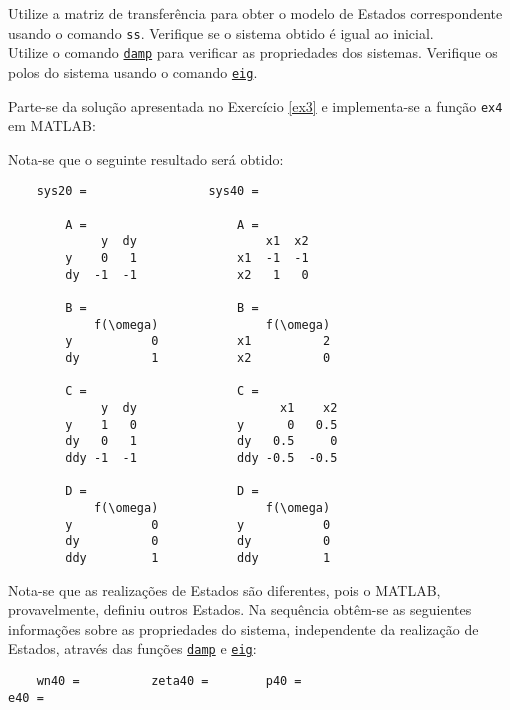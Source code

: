 \documentclass{article}
\begin{document}
\newpage\begin{exercise}\label{ex4}
    Utilize a matriz de transferência para obter o modelo de Estados correspondente usando o comando \texttt{ss}. Verifique se o sistema obtido é igual ao inicial.\\

    Utilize o comando \href{https://www.mathworks.com/help/control/ref/lti.damp.html}{\texttt{damp}} para verificar as propriedades dos sistemas. Verifique os polos do sistema usando o comando \href{https://www.mathworks.com/help/matlab/ref/eig.html}{\texttt{eig}}.
\end{exercise}
\begin{resolution}
    Parte-se da solução apresentada no Exercício \ref{ex3} e implementa-se a função \texttt{ex4} em MATLAB:
    \begin{scriptsize}
        \myMatlab
    \end{scriptsize}
    Nota-se que o seguinte resultado será obtido:
    \begin{scriptsize}
        \myMatlab\begin{lstlisting}
    sys20 =                 sys40 =
                            
        A =                     A = 
             y  dy                  x1  x2
        y    0   1              x1  -1  -1
        dy  -1  -1              x2   1   0
                            
        B =                     B = 
            f(\omega)               f(\omega)
        y           0           x1          2
        dy          1           x2          0
                            
        C =                     C = 
             y  dy                    x1    x2
        y    1   0              y      0   0.5
        dy   0   1              dy   0.5     0
        ddy -1  -1              ddy -0.5  -0.5
                                
        D =                     D = 
            f(\omega)               f(\omega)
        y           0           y           0
        dy          0           dy          0
        ddy         1           ddy         1
        \end{lstlisting}
    \end{scriptsize}
    Nota-se que as realizações de Estados são diferentes, pois o MATLAB, provavelmente, definiu outros Estados. Na sequência obtêm-se as seguientes informações sobre as propriedades do sistema, independente da realização de Estados, através das funções \href{https://www.mathworks.com/help/control/ref/lti.damp.html}{\texttt{damp}} e \href{https://www.mathworks.com/help/matlab/ref/eig.html}{\texttt{eig}}: 
    \begin{scriptsize}
        \myMatlab\begin{lstlisting}
    wn40 =          zeta40 =        p40 =                           e40 =


\end{lstlisting}
\end{scriptsize}
\end{resolution}
\end{document}
